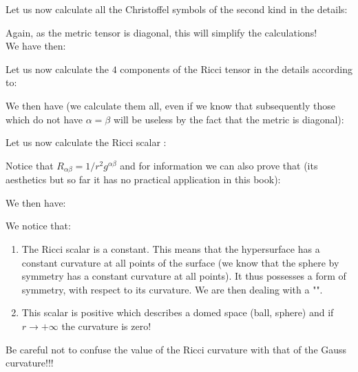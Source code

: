 	\begin{tcolorbox}[colframe=black,colback=white,sharp corners]
	
	Let us now calculate all the Christoffel symbols of the second kind in the details:
	
	Again, as the metric tensor is diagonal, this will simplify the calculations!\\

	We have then:
	
	Let us now calculate the $4$ components of the Ricci tensor in the details according to:
	
	We then have (we calculate them all, even if we know that subsequently those which do not have $\alpha=\beta$ will be useless by the fact that the metric is diagonal):
	
	\end{tcolorbox}
	
	
	\begin{tcolorbox}[colframe=black,colback=white,sharp corners]
	
	Let us now calculate the Ricci scalar :
	
	\begin{tcolorbox}[title=Remark,colframe=black,arc=10pt]
	Notice that $R_{\alpha\beta}=1/r^2 g^{\alpha\beta}$ and for information we can also prove that (its aesthetics but so far it has no practical application in this book):
	
	\end{tcolorbox}
	We then have:
	
	We notice that:
	\begin{enumerate}
		\item The Ricci scalar is a constant. This means that the hypersurface has a constant curvature at all points of the surface (we know that the sphere by symmetry has a constant curvature at all points). It thus possesses a form of symmetry, with respect to its curvature. We are then dealing with a "".

		\item This scalar is positive which describes a domed space (ball, sphere) and if $r\rightarrow +\infty$ the curvature is zero!
	\end{enumerate}
	\end{tcolorbox}
	\begin{tcolorbox}[title=Remark,colframe=black,arc=10pt]
	Be careful not to confuse the value of the Ricci curvature with that of the Gauss curvature!!!
	\end{tcolorbox}
	
